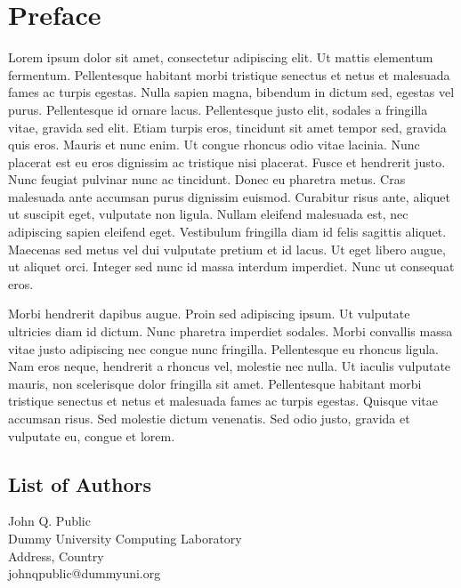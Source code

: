 \documentclass[a4paper,UKenglish]{lipicsmaster-v2021}
\begin{document}
\chapter{Preface}

Lorem ipsum dolor sit amet, consectetur adipiscing elit. Ut mattis
elementum fermentum. Pellentesque habitant morbi tristique senectus et
netus et malesuada fames ac turpis egestas. Nulla sapien magna,
bibendum in dictum sed, egestas vel purus. Pellentesque id ornare
lacus. Pellentesque justo elit, sodales a fringilla vitae, gravida sed
elit. Etiam turpis eros, tincidunt sit amet tempor sed, gravida quis
eros. Mauris et nunc enim. Ut congue rhoncus odio vitae lacinia. Nunc
placerat est eu eros dignissim ac tristique nisi placerat. Fusce et
hendrerit justo. Nunc feugiat pulvinar nunc ac tincidunt. Donec eu
pharetra metus. Cras malesuada ante accumsan purus dignissim
euismod. Curabitur risus ante, aliquet ut suscipit eget, vulputate non
ligula. Nullam eleifend malesuada est, nec adipiscing sapien eleifend
eget. Vestibulum fringilla diam id felis sagittis aliquet. Maecenas
sed metus vel dui vulputate pretium et id lacus. Ut eget libero augue,
ut aliquet orci. Integer sed nunc id massa interdum imperdiet. Nunc ut
consequat eros.

Morbi hendrerit dapibus augue. Proin sed adipiscing ipsum. Ut
vulputate ultricies diam id dictum. Nunc pharetra imperdiet
sodales. Morbi convallis massa vitae justo adipiscing nec congue nunc
fringilla. Pellentesque eu rhoncus ligula. Nam eros neque, hendrerit a
rhoncus vel, molestie nec nulla. Ut iaculis vulputate mauris, non
scelerisque dolor fringilla sit amet. Pellentesque habitant morbi
tristique senectus et netus et malesuada fames ac turpis
egestas. Quisque vitae accumsan risus. Sed molestie dictum
venenatis. Sed odio justo, gravida et vulputate eu, congue et lorem. 


\begin{participants}
\chapter[Authors]{List of Authors}
\participant John Q. Public\\ 
Dummy University Computing Laboratory\\
Address, Country\\
johnqpublic@dummyuni.org

\end{participants} 
\end{document}
